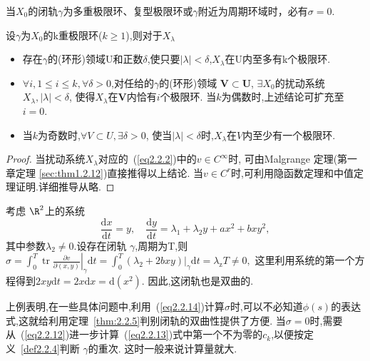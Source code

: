\begin{corollary}
  \label{colory 2.6}
  当$X_{0}$的闭轨$\gamma$为多重极限环、复型极限环或$\gamma$附近为周期环域时，必有$\sigma=0$.
\end{corollary}

\begin{theorem}
  \label{thm2.7}
  设$\gamma$为$X_{0}$的k重极限环($k \geqslant 1$),则对于$X_{\lambda}$
  \begin{itemize}
\item 存在$\gamma$的(环形)领域U和正数$\delta$,使只要$|\lambda|<\delta$,$X_{\lambda}$在U内至多有k个极限环.
\item $\forall i, 1 \leqslant i \leqslant k, \forall \delta>0$,对任给的$\gamma$的(环形)领域 $\boldsymbol{V} \subset \boldsymbol{U}$,
  $\exists X_{0}$的扰动系统$X_{\lambda},|\lambda|<\delta$,
  使得$X_{\lambda}$在$ \boldsymbol{V} $内恰有$i$个极限环.
  当$k$为偶数时,上述结论可扩充至$i=0$.
\item 当$k$为奇数时,$\forall V \subset U, \exists \delta>0$,
  使当$|\lambda|<\delta$时,$X_{\lambda}$在$V$内至少有一个极限环.
\end{itemize}
\end{theorem}

\begin{proof}
  当扰动系统$X_{\lambda}$对应的~(\ref{eq2.2.2})中的$v \in C^{\infty}$时,
  可由Malgrange 定理(第一章定理 \ref{sec:thm1.2.12})直接推得以上结论.
  当$v \in C^{r}$时,可利用隐函数定理和中值定理证明.详细推导从略.
\end{proof}

\begin{example}
  \label{exam:2.8}
  考虑 $\R^{2}$上的系统
  $$\frac{\mathrm{d} x}{\mathrm{d} t}=y, \quad \frac{\mathrm{d} y}{\mathrm{d} t}=\lambda_{1}+\lambda_{2} y+a x^{2}+b x y^{2},$$
  其中参数$\lambda_{2} \neq 0$.设存在闭轨 $\gamma$,周期为T,则
  $\sigma=\int_{0}^{T} \operatorname{tr}\left.\frac{\partial v}{\partial(x, y)}\right|_{\gamma} \mathrm{d} t=\int_{0}^{T}\left.\left(\lambda_{2}+2 b x y\right)\right|_{\gamma} \mathrm{d} t=\lambda_{\mathrm{z}} T \neq 0,$
  这里利用系统的第一个方程得到$2 x y \mathrm{d} t=2 x \mathrm{d} x=\mathrm{d}\left(x^{2}\right)$.
  因此,这闭轨也是双曲的.
\end{example}

\begin{corollary}
  \label{corollary:2.9}
  上例表明,在一些具体问题中,利用~(\ref{eq2.2.14})计算$\sigma$时,可以不必知道$\phi(s)$的表达式,这就给利用定理~\ref{thm:2.2.5}判别闭轨的双曲性提供了方便.
  当$\sigma=0$时,需要从~(\ref{eq2.2.12})进一步计算~(\ref{eq2.2.13})式中第一个不为零的$c_k$,以便按定义~\ref{def2.2.4}判断 $\gamma$的重次.
  这时一般来说计算量就大.
\end{corollary}

